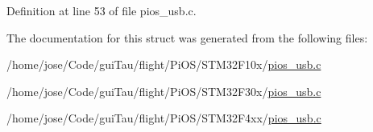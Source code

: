 Definition at line 53 of file pios\-\_\-usb.\-c.



The documentation for this struct was generated from the following files\-:\begin{DoxyCompactItemize}
\item 
/home/jose/\-Code/gui\-Tau/flight/\-Pi\-O\-S/\-S\-T\-M32\-F10x/\hyperlink{_s_t_m32_f10x_2pios__usb_8c}{pios\-\_\-usb.\-c}\item 
/home/jose/\-Code/gui\-Tau/flight/\-Pi\-O\-S/\-S\-T\-M32\-F30x/\hyperlink{_s_t_m32_f30x_2pios__usb_8c}{pios\-\_\-usb.\-c}\item 
/home/jose/\-Code/gui\-Tau/flight/\-Pi\-O\-S/\-S\-T\-M32\-F4xx/\hyperlink{_s_t_m32_f4xx_2pios__usb_8c}{pios\-\_\-usb.\-c}\end{DoxyCompactItemize}
